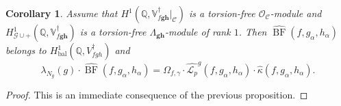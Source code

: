 \documentclass[a4paper,11pt]{amsart}
\theoremstyle{plain}
\newtheorem{theorem}{Theorem}[section]
\newtheorem{corollary}[theorem]{Corollary}
\theoremstyle{definition}
\theoremstyle{remark}
\newtheorem{remarkwr}[theorem]{Remark}
\newenvironment{remark}{\begin{remarkwr}\begin{upshape}}{\end{upshape}\end{remarkwr}}
\newcommand{\bb}{\mathbb}
\newcommand{\cl}{\mathcal}
\DeclareMathOperator{\BF}{BF}
\DeclareMathOperator{\bal}{bal}
\newcommand{\Lp}{{\mathscr{L}_p}}
\newcommand{\Sel}{\mathrm{Sel}}
\newcommand{\hg}{{\mathbf{g}}}
\newcommand{\hh}{{\mathbf h}}
\newcommand{\res}{\mathrm{res}}
\numberwithin{equation}{section}
\begin{document}
\begin{corollary}
    Assume that $H^1(\bb{Q},\bb{V}_{f\hg\hh}^\dagger\vert_{\cl{C}})$ is a torsion-free $\cl{O}_{\cl{C}}$-module and $H^1_{\cl{G}\cup +}(\bb{Q},\bb{V}_{f\hg\hh}^\dagger)$ is a torsion-free $\Lambda_{\hg\hh}$-module of rank $1$. Then $\widehat{\BF}(f,g_\alpha,h_\alpha)$ belongs to $H^1_{\bal}(\bb{Q}, V_{fgh}^\dagger)$ and
    \[
    \lambda_{N_g}(g)\cdot\widehat{\BF}(f,g_\alpha,h_\alpha)=\Omega_{f,\gamma}\cdot \widehat{\Lp}^g(f,g_\alpha,h_\alpha) \cdot \widehat{\kappa}(f,g_\alpha,h_\alpha).
    \]
\end{corollary}
\begin{proof}
    This is an immediate consequence of the previous proposition.
\end{proof}

\end{document}
